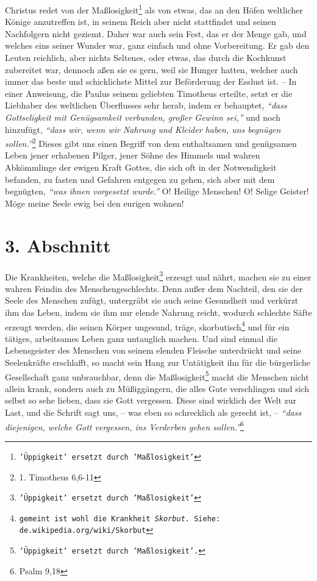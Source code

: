 \medskip

Christus redet von der Maßlosigkeit\footnote{\texttt{'Üppigkeit' ersetzt durch
'Maßlosigkeit'}} als von
etwas, das an den Höfen weltlicher
Könige anzutreffen ist, in seinem Reich aber nicht stattfindet und seinen
Nachfolgern nicht geziemt. Daher war auch sein Fest, das er der Menge gab, und
welches eins seiner Wunder war, ganz einfach und ohne Vorbereitung. Er gab den
Leuten reichlich, aber nichts Seltenes, oder etwas, das durch die
Kochkunst
zubereitet war, dennoch aßen sie es gern, weil sie Hunger hatten, welcher auch
immer das beste und schicklichste Mittel zur Beförderung der Esslust ist. -- In
einer Anweisung, die Paulus seinem geliebten Timotheus erteilte, setzt er die
Liebhaber des weltlichen Überflusses sehr herab, indem er behauptet,
\textit{"`dass Gottseligkeit mit Genügsamkeit verbunden, großer Gewinn sei,"'}
und noch
hinzufügt, \textit{"`dass wir, wenn wir Nahrung und Kleider haben, uns begnügen
sollen."'}\footnote{1. Timotheus 6,6-11}
Dieses gibt uns einen Begriff von dem
enthaltsamen und genügsamen Leben jener erhabenen
Pilger, jener
Söhne des Himmels und wahren Abkömmlinge der
ewigen Kraft
Gottes, die sich oft in der
Notwendigkeit befanden, zu fasten und Gefahren entgegen zu gehen,
sich aber
mit dem begnügten, \textit{"`was ihnen vorgesetzt wurde."'} O! Heilige Menschen!
O!
Selige Geister! Möge meine Seele ewig bei den eurigen wohnen!

\section{3. Abschnitt} \label{kap14_ab3}

Die Krankheiten, welche die Maßlosigkeit\footnote{\texttt{'Üppigkeit' ersetzt
durch 'Maßlosigkeit'}} erzeugt
und nährt, machen sie zu einer
wahren Feindin des Menschengeschlechts. Denn außer dem Nachteil, den sie der
Seele des Menschen zufügt, untergräbt sie auch seine
Gesundheit und verkürzt ihm
das Leben, indem sie ihm nur elende Nahrung reicht, wodurch schlechte Säfte
erzeugt werden, die seinen Körper ungesund, träge,
skorbutisch\footnote{\texttt{gemeint ist
wohl die Krankheit \textit{Skorbut}. Siehe: de.wikipedia.org/wiki/Skorbut}} und
für ein tätiges,
arbeitsames Leben ganz untauglich machen. Und sind
einmal die Lebensgeister des
Menschen von seinem elenden Fleische unterdrückt und seine Seelenkräfte
erschlafft, so macht sein Hang zur Untätigkeit ihn für die
bürgerliche Gesellschaft
 ganz unbrauchbar,
denn die Maßlosigkeit\footnote{\texttt{'Üppigkeit' ersetzt durch 'Maßlosigkeit'.}}
macht die Menschen nicht
allein krank, sondern auch zu Müßiggängern, die alles Gute
verschlingen und
sich selbst so sehe lieben, dass sie Gott vergessen. Diese sind wirklich der
Welt
zur Last, und die Schrift sagt uns, -- was eben so
schrecklich
als gerecht ist,
-- \textit{"`dass diejenigen, welche Gott vergessen, ins Verderben gehen
sollen."'}\footnote{Psalm 9,18}

